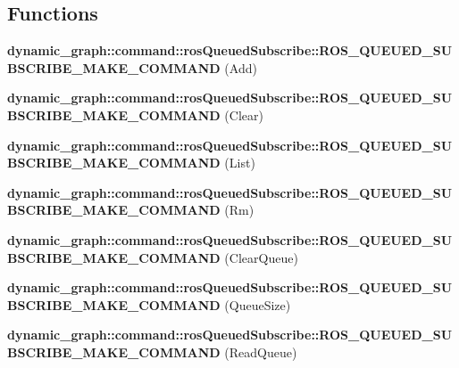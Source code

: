 \subsection*{Functions}
\begin{DoxyCompactItemize}
\item 
{\bfseries dynamic\+\_\+graph\+::command\+::ros\+Queued\+Subscribe\+::\+R\+O\+S\+\_\+\+Q\+U\+E\+U\+E\+D\+\_\+\+S\+U\+B\+S\+C\+R\+I\+B\+E\+\_\+\+M\+A\+K\+E\+\_\+\+C\+O\+M\+M\+A\+ND} (Add)\hypertarget{ros__queued__subscribe_8hh_aef1263d3cfe9681448c0d69649179259}{}\label{ros__queued__subscribe_8hh_aef1263d3cfe9681448c0d69649179259}

\item 
{\bfseries dynamic\+\_\+graph\+::command\+::ros\+Queued\+Subscribe\+::\+R\+O\+S\+\_\+\+Q\+U\+E\+U\+E\+D\+\_\+\+S\+U\+B\+S\+C\+R\+I\+B\+E\+\_\+\+M\+A\+K\+E\+\_\+\+C\+O\+M\+M\+A\+ND} (Clear)\hypertarget{ros__queued__subscribe_8hh_a7845a3bacdc7be03123b88140ea091f9}{}\label{ros__queued__subscribe_8hh_a7845a3bacdc7be03123b88140ea091f9}

\item 
{\bfseries dynamic\+\_\+graph\+::command\+::ros\+Queued\+Subscribe\+::\+R\+O\+S\+\_\+\+Q\+U\+E\+U\+E\+D\+\_\+\+S\+U\+B\+S\+C\+R\+I\+B\+E\+\_\+\+M\+A\+K\+E\+\_\+\+C\+O\+M\+M\+A\+ND} (List)\hypertarget{ros__queued__subscribe_8hh_a4c330a8b4a91c14660428bd492055941}{}\label{ros__queued__subscribe_8hh_a4c330a8b4a91c14660428bd492055941}

\item 
{\bfseries dynamic\+\_\+graph\+::command\+::ros\+Queued\+Subscribe\+::\+R\+O\+S\+\_\+\+Q\+U\+E\+U\+E\+D\+\_\+\+S\+U\+B\+S\+C\+R\+I\+B\+E\+\_\+\+M\+A\+K\+E\+\_\+\+C\+O\+M\+M\+A\+ND} (Rm)\hypertarget{ros__queued__subscribe_8hh_ae6258e34dff92af9fbbfa2eb7e6417d7}{}\label{ros__queued__subscribe_8hh_ae6258e34dff92af9fbbfa2eb7e6417d7}

\item 
{\bfseries dynamic\+\_\+graph\+::command\+::ros\+Queued\+Subscribe\+::\+R\+O\+S\+\_\+\+Q\+U\+E\+U\+E\+D\+\_\+\+S\+U\+B\+S\+C\+R\+I\+B\+E\+\_\+\+M\+A\+K\+E\+\_\+\+C\+O\+M\+M\+A\+ND} (Clear\+Queue)\hypertarget{ros__queued__subscribe_8hh_a42b7f79773943fc41f6a89e21016c8c8}{}\label{ros__queued__subscribe_8hh_a42b7f79773943fc41f6a89e21016c8c8}

\item 
{\bfseries dynamic\+\_\+graph\+::command\+::ros\+Queued\+Subscribe\+::\+R\+O\+S\+\_\+\+Q\+U\+E\+U\+E\+D\+\_\+\+S\+U\+B\+S\+C\+R\+I\+B\+E\+\_\+\+M\+A\+K\+E\+\_\+\+C\+O\+M\+M\+A\+ND} (Queue\+Size)\hypertarget{ros__queued__subscribe_8hh_a63b0f2aac37b808005de5acf0938a07c}{}\label{ros__queued__subscribe_8hh_a63b0f2aac37b808005de5acf0938a07c}

\item 
{\bfseries dynamic\+\_\+graph\+::command\+::ros\+Queued\+Subscribe\+::\+R\+O\+S\+\_\+\+Q\+U\+E\+U\+E\+D\+\_\+\+S\+U\+B\+S\+C\+R\+I\+B\+E\+\_\+\+M\+A\+K\+E\+\_\+\+C\+O\+M\+M\+A\+ND} (Read\+Queue)\hypertarget{ros__queued__subscribe_8hh_a08be185dee34f55b3b9fff2c289b1c3d}{}\label{ros__queued__subscribe_8hh_a08be185dee34f55b3b9fff2c289b1c3d}

\end{DoxyCompactItemize}



